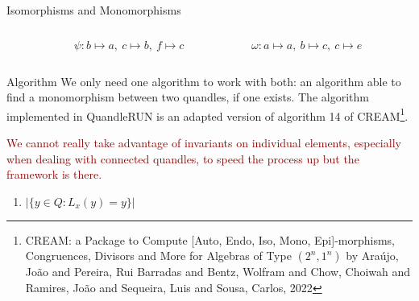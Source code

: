 \begin{frame}{Isomorphisms and Monomorphisms}
\begin{columns}
\begin{column}{0.33\linewidth}
\begin{center}
\end{center}
\end{column}
\begin{column}{0.33\linewidth}
\begin{center}
     $\psi: b \mapsto a,~c\mapsto b,~f\mapsto c$\newline
\end{center}
\end{column}
\begin{column}{0.33\linewidth}
\begin{center}
     $\omega: a \mapsto a,~b\mapsto c,~c\mapsto e$\newline
\end{center}
\end{column}
\end{columns}
\end{frame}

\begin{frame}{Algorithm}
We only need one algorithm to work with both: an algorithm able to find a monomorphism between two quandles, if one exists. \newline\newline The algorithm implemented in QuandleRUN is an adapted version of algorithm 14 of CREAM\footnote{CREAM: a Package to Compute [Auto, Endo, Iso, Mono, Epi]-morphisms, Congruences, Divisors and More for Algebras of Type $(2^n, 1^n)$ by Ara{\'u}jo, Jo{\~a}o and Pereira, Rui Barradas and Bentz, Wolfram and Chow, Choiwah and Ramires, Jo{\~a}o and Sequeira, Luis and Sousa, Carlos, 2022\newline}.
\begin{center}
    
    \textcolor{darkred}{We cannot really take advantage of invariants on individual elements, especially when dealing with connected quandles, to speed the process up but the framework is there.} 
\end{center}
\begin{example}
       \begin{enumerate}
           \item $|\{ y \in Q : L_x(y) = y\}|$
       \end{enumerate}
\end{example}
\end{frame}

